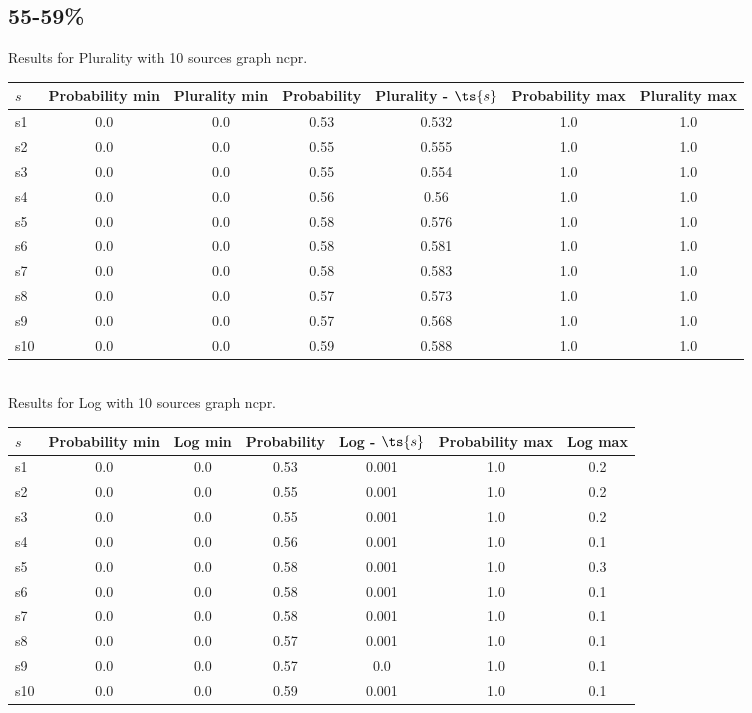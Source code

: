\documentclass{article}
\begin{document}
\newpage

\subsection{55-59\%}

\noindent Results for Plurality with 10 sources graph ncpr.

\noindent\begin{tabular}{|l|c|c|c|c|c|c|}
\hline
$s$& Probability min & Plurality min & Probability & Plurality - $\ts{s}$ & Probability max & Plurality max\\
\hline
s1 &0.0 & 0.0 & 0.53 & 0.532 & 1.0 & 1.0\\
\hline
s2 &0.0 & 0.0 & 0.55 & 0.555 & 1.0 & 1.0\\
\hline
s3 &0.0 & 0.0 & 0.55 & 0.554 & 1.0 & 1.0\\
\hline
s4 &0.0 & 0.0 & 0.56 & 0.56 & 1.0 & 1.0\\
\hline
s5 &0.0 & 0.0 & 0.58 & 0.576 & 1.0 & 1.0\\
\hline
s6 &0.0 & 0.0 & 0.58 & 0.581 & 1.0 & 1.0\\
\hline
s7 &0.0 & 0.0 & 0.58 & 0.583 & 1.0 & 1.0\\
\hline
s8 &0.0 & 0.0 & 0.57 & 0.573 & 1.0 & 1.0\\
\hline
s9 &0.0 & 0.0 & 0.57 & 0.568 & 1.0 & 1.0\\
\hline
s10 &0.0 & 0.0 & 0.59 & 0.588 & 1.0 & 1.0\\
\hline
\end{tabular}\\

\noindent Results for Log with 10 sources graph ncpr.

\noindent\begin{tabular}{|l|c|c|c|c|c|c|}
\hline
$s$& Probability min & Log min & Probability & Log - $\ts{s}$ & Probability max & Log max\\
\hline
s1 &0.0 & 0.0 & 0.53 & 0.001 & 1.0 & 0.2\\
\hline
s2 &0.0 & 0.0 & 0.55 & 0.001 & 1.0 & 0.2\\
\hline
s3 &0.0 & 0.0 & 0.55 & 0.001 & 1.0 & 0.2\\
\hline
s4 &0.0 & 0.0 & 0.56 & 0.001 & 1.0 & 0.1\\
\hline
s5 &0.0 & 0.0 & 0.58 & 0.001 & 1.0 & 0.3\\
\hline
s6 &0.0 & 0.0 & 0.58 & 0.001 & 1.0 & 0.1\\
\hline
s7 &0.0 & 0.0 & 0.58 & 0.001 & 1.0 & 0.1\\
\hline
s8 &0.0 & 0.0 & 0.57 & 0.001 & 1.0 & 0.1\\
\hline
s9 &0.0 & 0.0 & 0.57 & 0.0 & 1.0 & 0.1\\
\hline
s10 &0.0 & 0.0 & 0.59 & 0.001 & 1.0 & 0.1\\
\hline
\end{tabular}\\
\end{document}
